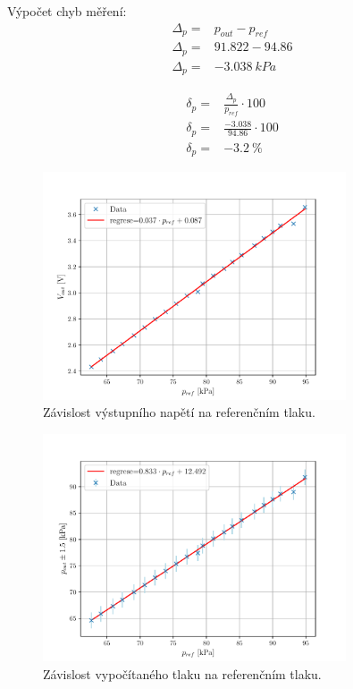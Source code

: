 \documentclass{protokol}
\begin{document}
        Výpočet chyb měření:
        \begin{align*}
            \Delta_{p} =& p_{out} - p_{ref}  \\
            \Delta_{p} =& \num{91.822} - \num{94.86}  \\
            \Delta_{p} =& \qty{-3,038}{kPa}
        \end{align*}

        \begin{align*}
            \delta_{p} =& \frac{\Delta_{p}}{p_{ref}}\cdot 100  \\
            \delta_{p} =& \frac{\num{-3,038}}{\num{94.86}}\cdot 100  \\
            \delta_{p} =& \qty{-3,2}{\percent}
        \end{align*}


        \begin{figure}[h!]
            \centering
            \includegraphics[width=0.8\textwidth]{img/graf-1.pdf}
            \caption{Závislost výstupního napětí na referenčním tlaku.}
            \label{fig:img/graf-1}
        \end{figure}

        \begin{figure}[h!]
            \centering
            \includegraphics[width=0.8\textwidth]{img/graf-2.pdf}
            \caption{Závislost vypočítaného tlaku na referenčním tlaku.}
            \label{fig:img/graf-2}
        \end{figure}
\end{document}
